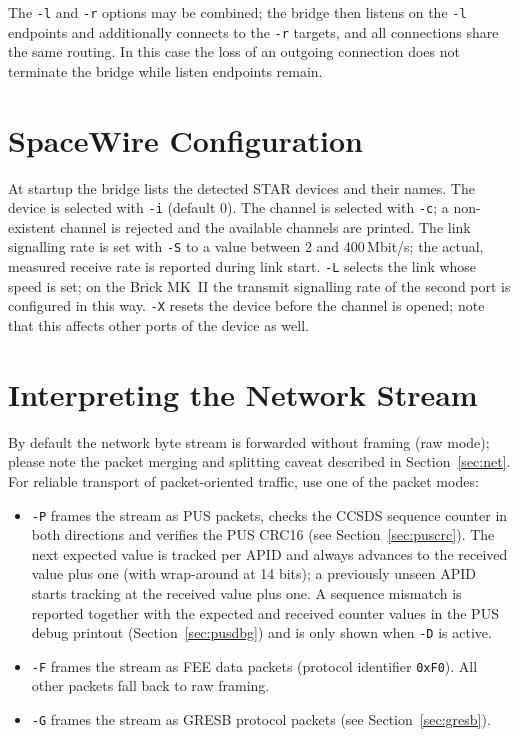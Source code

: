 \noindent
The \texttt{-l} and \texttt{-r} options may be combined; the bridge then
listens on the \texttt{-l} endpoints and additionally connects to the
\texttt{-r} targets, and all connections share the same routing. In this
case the loss of an outgoing connection does not terminate the bridge while
listen endpoints remain.

\section{SpaceWire Configuration}

At startup the bridge lists the detected \gls{STAR} devices and their names.
The device is selected with \texttt{-i} (default 0). The channel is selected
with \texttt{-c}; a non-existent channel is rejected and the available
channels are printed. The link signalling rate is set with \texttt{-S} to a
value between 2 and 400\,Mbit/s; the actual, measured receive rate is
reported during link start. \texttt{-L} selects the link whose speed is set;
on the Brick MK~II the transmit signalling rate of the second port is
configured in this way. \texttt{-X} resets the device before the channel is
opened; note that this affects other ports of the device as well.

\section{Interpreting the Network Stream}

By default the network byte stream is forwarded without framing (raw mode);
please note the packet merging and splitting caveat described in
Section~\ref{sec:net}. For reliable transport of packet-oriented traffic,
use one of the packet modes:

\begin{itemize}

\item \texttt{-P} frames the stream as \gls{PUS} packets, checks the CCSDS
sequence counter in both directions and verifies the PUS CRC16 (see
Section~\ref{sec:puscrc}). The next expected value is tracked per APID and
always advances to the received value plus one (with wrap-around at 14 bits);
a previously unseen APID starts tracking at the received value plus one. A
sequence mismatch is reported together with the expected and received counter
values in the PUS debug printout (Section~\ref{sec:pusdbg}) and is only shown
when \texttt{-D} is active.\\

\item \texttt{-F} frames the stream as FEE data packets (protocol identifier
\texttt{0xF0}). All other packets fall back to raw framing.\\

\item \texttt{-G} frames the stream as GRESB protocol packets (see
Section~\ref{sec:gresb}).\\

\end{itemize}

